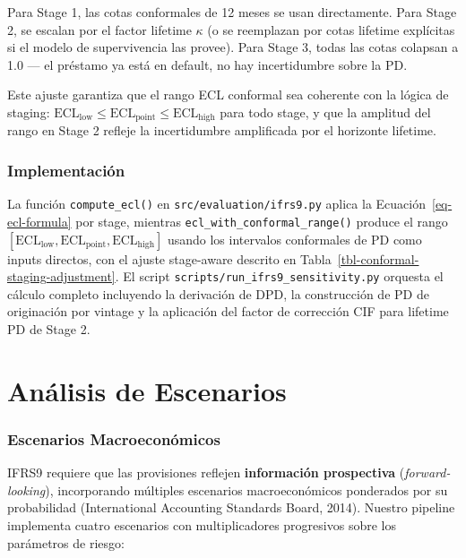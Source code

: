 \documentclass[
  spanish,
  11pt,
  letterpaper,
]{scrbook}
\theoremstyle{plain}
\theoremstyle{remark}
\begin{document}
Para Stage 1, las cotas conformales de 12 meses se usan directamente.
Para Stage 2, se escalan por el factor lifetime \(\kappa\) (o se
reemplazan por cotas lifetime explícitas si el modelo de supervivencia
las provee). Para Stage 3, todas las cotas colapsan a 1.0 --- el
préstamo ya está en default, no hay incertidumbre sobre la PD.

Este ajuste garantiza que el rango ECL conformal sea coherente con la
lógica de staging:
\(\text{ECL}_\text{low} \leq \text{ECL}_\text{point} \leq \text{ECL}_\text{high}\)
para todo stage, y que la amplitud del rango en Stage 2 refleje la
incertidumbre amplificada por el horizonte lifetime.

\subsection{Implementación}\label{implementaciuxf3n-1}

La función \texttt{compute\_ecl()} en \texttt{src/evaluation/ifrs9.py}
aplica la Ecuación~\ref{eq-ecl-formula} por stage, mientras
\texttt{ecl\_with\_conformal\_range()} produce el rango
\([\text{ECL}_\text{low}, \text{ECL}_\text{point}, \text{ECL}_\text{high}]\)
usando los intervalos conformales de PD como inputs directos, con el
ajuste stage-aware descrito en
Tabla~\ref{tbl-conformal-staging-adjustment}. El script
\texttt{scripts/run\_ifrs9\_sensitivity.py} orquesta el cálculo completo
incluyendo la derivación de DPD, la construcción de PD de originación
por vintage y la aplicación del factor de corrección CIF para lifetime
PD de Stage 2.

\chapter{Análisis de Escenarios}\label{sec-scenario-analysis}

\subsection{Escenarios
Macroeconómicos}\label{escenarios-macroeconuxf3micos}

IFRS9 requiere que las provisiones reflejen \textbf{información
prospectiva} (\emph{forward-looking}), incorporando múltiples escenarios
macroeconómicos ponderados por su probabilidad (International Accounting
Standards Board, 2014). Nuestro pipeline implementa cuatro escenarios
con multiplicadores progresivos sobre los parámetros de riesgo:
\end{document}
